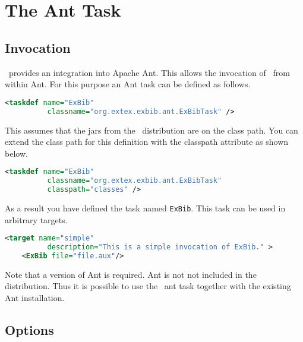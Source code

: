 
\section{The \ExBib{} Ant Task}%

\subsection{Invocation}

\ExBib\ provides an integration into Apache Ant. This allows the
invocation of \ExBib\ from within Ant. For this purpose an Ant task
can be defined as follows.

\begin{lstlisting}[language=XML,morekeywords={taskdef}]
 <taskdef name="ExBib"
          classname="org.extex.exbib.ant.ExBibTask" />
\end{lstlisting}

This assumes that the jars from the \ExBib\ distribution are on the
class path. You can extend the class path for this definition with the
classpath attribute as shown below.

\begin{lstlisting}[language=XML,morekeywords={taskdef}]
 <taskdef name="ExBib"
          classname="org.extex.exbib.ant.ExBibTask"
          classpath="classes" />
\end{lstlisting}

As a result you have defined the task named \texttt{ExBib}. This task
can be used in arbitrary targets.

\begin{lstlisting}[language=XML,morekeywords={target}]
  <target name="simple"
          description="This is a simple invocation of ExBib." >
    <ExBib file="file.aux"/>
\end{lstlisting}

Note that a version of Ant is required. Ant is not not included in the
distribution. Thus it is possible to use the \ExBib\ ant task together
with the existing Ant installation.


\subsection{Options}

